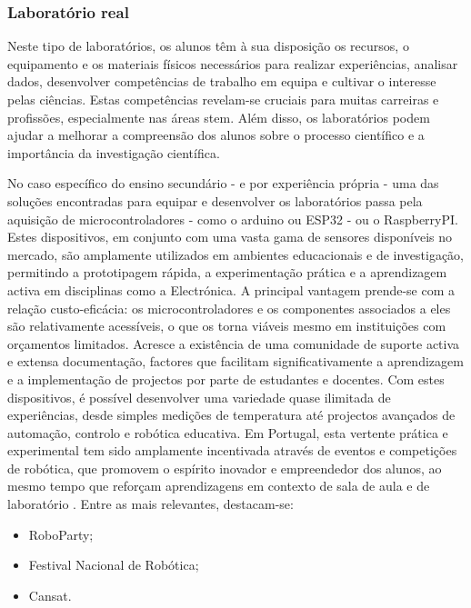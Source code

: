 \subsubsection{Laboratório real}
Neste tipo de laboratórios, os alunos têm à sua disposição os recursos, o equipamento e os materiais físicos necessários para realizar experiências, analisar dados, desenvolver competências de trabalho em equipa e cultivar o interesse pelas ciências. Estas competências revelam-se cruciais para muitas carreiras e profissões, especialmente nas áreas \acrshort{stem}. Além disso, os laboratórios podem ajudar a melhorar a compreensão dos alunos sobre o processo científico e a importância da investigação científica.

No caso específico do ensino secundário - e por experiência própria - uma das soluções encontradas para equipar e desenvolver os laboratórios passa pela aquisição de microcontroladores - como o \gls{arduino} ou \gls{ESP32} - ou o \gls{RaspberryPI}. Estes dispositivos, em conjunto com uma vasta gama de sensores disponíveis no mercado, são amplamente utilizados em ambientes educacionais e de investigação, permitindo a prototipagem rápida, a experimentação prática e a aprendizagem activa em disciplinas como a Electrónica. A principal vantagem prende-se com a relação custo-eficácia: os microcontroladores e os componentes associados a eles são relativamente acessíveis, o que os torna viáveis mesmo em instituições com orçamentos limitados. Acresce a existência de uma comunidade de suporte activa e extensa documentação, factores que facilitam significativamente a aprendizagem e a implementação de projectos por parte de estudantes e docentes. Com estes dispositivos, é possível desenvolver uma variedade quase ilimitada de experiências, desde simples medições de temperatura até projectos avançados de automação, controlo e robótica educativa.
Em Portugal, esta vertente prática e experimental tem sido amplamente incentivada através de eventos e competições de robótica, que promovem o espírito inovador e empreendedor dos alunos, ao mesmo tempo que reforçam aprendizagens em contexto de sala de aula e de laboratório \cite{roboparty, fnr, cansat}. Entre as mais relevantes, destacam-se:
\begin{itemize}
    \item RoboParty;
    \item Festival Nacional de Robótica;
    \item Cansat.
\end{itemize}

